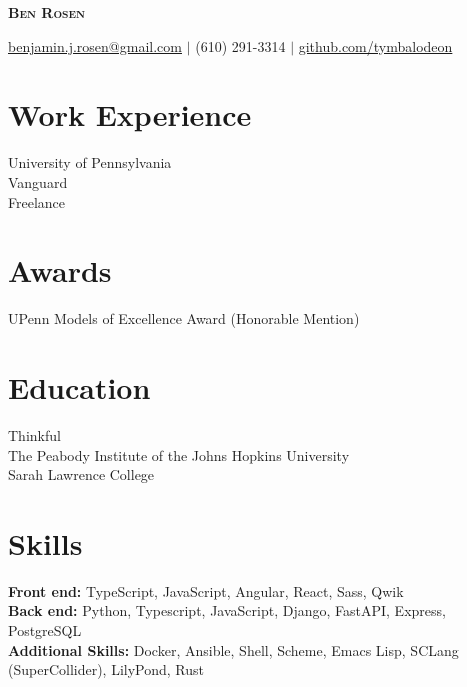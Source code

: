 \documentclass{article}
\begin{document}
\Huge{
  \textbf{
    \scshape{Ben Rosen}
  }
}

\small{
  \underline{benjamin.j.rosen@gmail.com}
}
$|$
\small{(610) 291-3314}
$|$
\small{
  \underline{github.com/tymbalodeon}
}

\section{Work Experience}

University of Pennsylvania \\
Vanguard \\
Freelance

\section{Awards}

UPenn Models of Excellence Award (Honorable Mention)

\section{Education}

Thinkful \\
The Peabody Institute of the Johns Hopkins University \\
Sarah Lawrence College

\section{Skills}

\textbf{Front end:} TypeScript, JavaScript, Angular, React, Sass, Qwik \\
\textbf{Back end:} Python, Typescript, JavaScript, Django, FastAPI, Express, PostgreSQL \\
\textbf{Additional Skills:} Docker, Ansible, Shell, Scheme, Emacs Lisp, SCLang (SuperCollider), LilyPond, Rust
\end{document}
